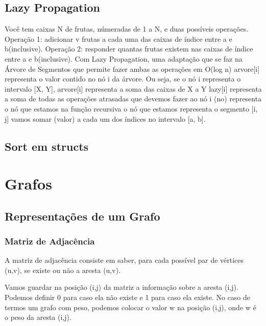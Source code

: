 \documentclass[a4paper,12pt]{article}
\begin{document}
\subsection{Lazy Propagation}
\indent Você tem caixas N de frutas, númeradas de 1 a N, e duas possíveis operações.
\newline Operação 1: adicionar v frutas a cada uma das caixas de índice entre a e b(inclusive).
\newline Operação 2: responder quantas frutas existem nas caixas de índice entre a e b(inclusive).
\newline Com Lazy Propagation, uma adaptação que se faz na Árvore de Segmentos que permite fazer ambas as operações em O(log n) arvore[i] representa o valor contido no nó i da árvore.
\newline Ou seja, se o nó i representa o intervalo [X, Y], arvore[i] representa a soma das caixas de X a Y lazy[i] representa a soma de todas as operações atrasadas que devemos fazer ao nó i (no) representa o nó que estamos na função recursiva o nó que estamos representa o segmento [i, j] vamos somar (valor) a cada um dos índices no intervalo [a, b].

\subsection{Sort em structs}

\newpage
\section{Grafos}
\subsection{Representações de um Grafo}
\subsubsection{Matriz de Adjacência}

\indent\indent A matriz de adjacência consiste em saber, para cada possível par de vértices (u,v), se existe ou não a aresta (u,v).

\indent Vamos guardar na posição (i,j) da matriz a informação sobre a aresta (i,j). Podemos definir 0 para caso ela não existe e 1 para caso ela existe. No caso de termos um grafo com peso, podemos colocar o valor w na posição (i,j), onde w é o peso da aresta (i,j).
\end{document}
